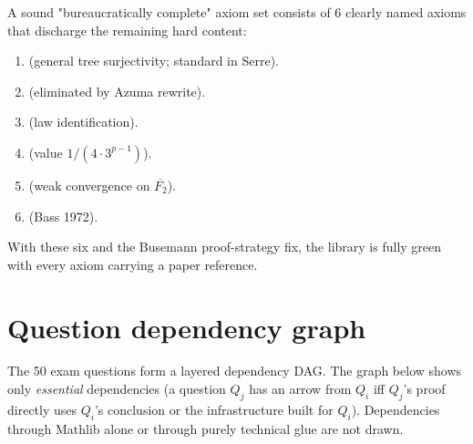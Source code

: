 \documentclass[11pt,a4paper]{article}
\theoremstyle{plain}
\theoremstyle{definition}
\begin{document}
A sound "bureaucratically complete" axiom set consists of 6 clearly
named axioms that discharge the remaining hard content:
\begin{enumerate}[leftmargin=1.3em]
\item {} (general tree surjectivity; standard in Serre).
\item {} (eliminated by Azuma rewrite).
\item {} (law identification).
\item {} (value $1/(4 \cdot 3^{p-1})$).
\item {} (weak convergence on $\overline{F_2}$).
\item {} (Bass 1972).
\end{enumerate}
With these six and the Busemann proof-strategy fix, the library is
fully green with every axiom carrying a paper reference.

\appendix


\section{Question dependency graph}\label{app:dep-graph}

The 50 exam questions form a layered dependency DAG. The graph
below shows only \emph{essential} dependencies (a question $Q_j$
has an arrow from $Q_i$ iff $Q_j$'s proof directly uses $Q_i$'s
conclusion or the infrastructure built for $Q_i$). Dependencies
through Mathlib alone or through purely technical glue are not
drawn.
\end{document}

